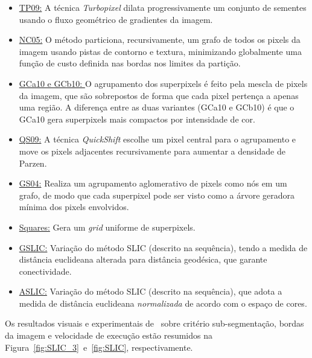 \begin{itemize}
    
    \item \underline{TP09:} A técnica \textit{Turbopixel} dilata progressivamente um conjunto de sementes usando o fluxo geométrico de gradientes da imagem.
    
    \item \underline{NC05:} O método particiona, recursivamente, um grafo de todos os pixels da imagem usando pistas de contorno e textura, minimizando globalmente uma função de custo definida nas bordas nos limites da partição.
    
    \item \underline{GCa10 e GCb10: } O agrupamento dos superpixels é feito pela mescla de pixels da imagem, que são sobrepostos de forma que cada pixel pertença a apenas uma região. 
    A diferença entre as duas variantes (GCa10 e GCb10) é que o GCa10 gera superpixels mais compactos por intensidade de cor.
    
    \item \underline{QS09:} A técnica \textit{QuickShift} escolhe um pixel central para o agrupamento e move os pixels adjacentes recursivamente para aumentar a densidade de Parzen.
    
    \item \underline{GS04:} Realiza um agrupamento aglomerativo de pixels como nós em um grafo, de modo que cada superpixel pode ser visto como a árvore geradora mínima dos pixels envolvidos.
    
    \item \underline{Squares:} Gera um \textit{grid} uniforme de superpixels.
    
    \item \underline{GSLIC:} Variação do método SLIC (descrito na sequência), tendo a medida de distância euclideana alterada para distância geodésica, que garante conectividade.
    
    \item \underline{ASLIC:} Variação do método SLIC (descrito na sequência), que adota a medida de distância euclideana \textit{normalizada} de acordo com o espaço de cores.
    
\end{itemize}

Os resultados visuais e experimentais de~ sobre critério sub-segmentação, bordas da imagem e velocidade de execução estão resumidos na Figura~\ref{fig:SLIC_3}~e~\ref{fig:SLIC}, respectivamente. 

